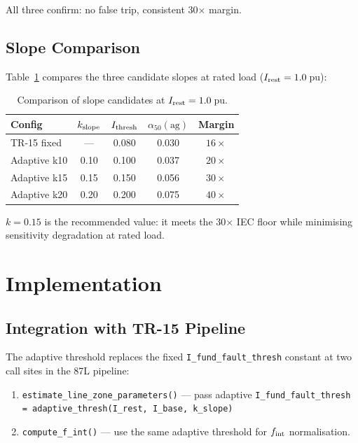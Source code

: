 \documentclass[11pt, a4paper]{article}
\begin{document}
All three confirm: no false trip, consistent 30$\times$ margin.

\subsection{Slope Comparison}

Table~\ref{tab:slopes} compares the three candidate slopes at rated load
($I_{\rm rest}=1.0$\,pu):

\begin{table}[h]
  \centering
  \caption{Comparison of slope candidates at $I_{\rm rest}=1.0$\,pu.}
  \label{tab:slopes}
  \begin{tabular}{lcccc}
    \toprule
    Config & $k_{\rm slope}$ & $I_{\rm thresh}$ & $\alpha_{50}(\text{ag})$ & Margin \\
    \midrule
    TR-15 fixed  & ---   & 0.080 & 0.030 & $16\times$ \\
    Adaptive k10 & 0.10  & 0.100 & 0.037 & $20\times$ \\
    Adaptive k15 & 0.15  & 0.150 & 0.056 & $30\times$ \\
    Adaptive k20 & 0.20  & 0.200 & 0.075 & $40\times$ \\
    \bottomrule
  \end{tabular}
\end{table}

$k=0.15$ is the recommended value: it meets the 30$\times$ IEC floor while
minimising sensitivity degradation at rated load.


\section{Implementation}
\label{sec:impl}

\subsection{Integration with TR-15 Pipeline}

The adaptive threshold replaces the fixed \texttt{I\_fund\_fault\_thresh}
constant at two call sites in the 87L pipeline:

\begin{enumerate}
  \item \texttt{estimate\_line\_zone\_parameters()} --- pass adaptive
        \texttt{I\_fund\_fault\_thresh = adaptive\_thresh(I\_rest, I\_base, k\_slope)}
  \item \texttt{compute\_f\_int()} --- use the same adaptive threshold for
        $f_{\rm int}$ normalisation.
\end{enumerate}
\end{document}
